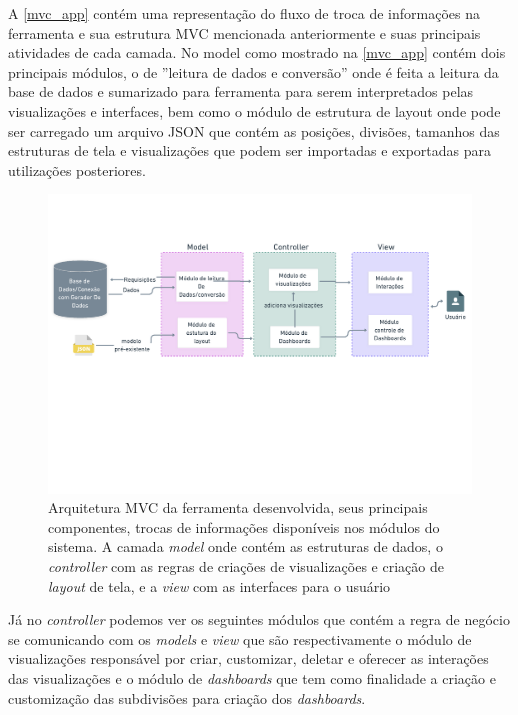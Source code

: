 \documentclass[
	12pt,				%
	openright,			%
	oneside,			%
	a4paper,			%
	english,			%
	brazil				%
	]{abntex2}
\begin{document}
A \autoref{mvc_app} contém uma representação do fluxo de troca de informações na ferramenta e sua estrutura MVC mencionada anteriormente e suas principais atividades de cada camada. No \textsf{model} como mostrado na \autoref{mvc_app} contém dois principais módulos, o de ''leitura de dados e conversão'' onde é feita a leitura da base de dados e sumarizado para ferramenta para serem interpretados pelas visualizações e interfaces, bem como o módulo de estrutura de \textsf{layout} onde pode ser carregado um arquivo JSON que contém as posições, divisões, tamanhos das estruturas de tela e visualizações que podem ser importadas e exportadas para utilizações posteriores.

\begin{figure}[h]
    
	\caption{Arquitetura MVC da ferramenta desenvolvida, seus principais componentes, trocas de informações disponíveis nos módulos do sistema. A camada \textit{model} onde contém as estruturas de dados, o \textit{controller} com as regras de criações de visualizações e criação de  \textit{layout} de tela, e a  \textit{view} com as interfaces para o usuário}
	\label{mvc_app}
	\begin{center}
	    \includegraphics[width=30pc,trim={0 260 0 0}]{figures/mvc_diagrama.pdf}
	\end{center}
\end{figure}


Já no \textit{controller} podemos ver os seguintes módulos que contém a regra de negócio se comunicando com os \textit{models} e \textit{view} que são respectivamente o módulo de visualizações responsável por criar, customizar, deletar e oferecer as interações das visualizações e o módulo de \textit{dashboards} que tem como finalidade a criação e customização das subdivisões para criação dos \textit{dashboards}.
\end{document}

